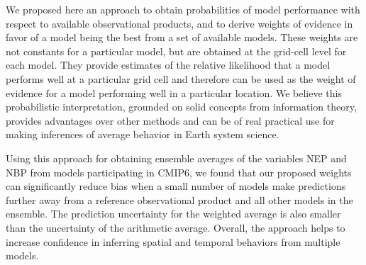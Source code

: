 \documentclass[gmd, manuscript]{copernicus}
\begin{document}
\conclusions  %
We proposed here an approach to obtain probabilities of model performance with respect to available observational products, and to derive weights of evidence in favor of a model being the best from a set of available models. These weights are not constants for a particular model, but are obtained at the grid-cell level for each model. They provide estimates of the relative likelihood that a model performs well at a particular grid cell and therefore can be used as the weight of evidence for a model performing well in a particular location. We believe this probabilistic interpretation, grounded on solid concepts from information theory, provides advantages over other methods and can be of real practical use for making inferences of average behavior in Earth system science. 

Using this approach for obtaining ensemble averages of the variables NEP and NBP from models participating in CMIP6, we found that our proposed weights can significantly reduce bias when a small number of models make predictions further away from a reference observational product and all other models in the ensemble. The prediction uncertainty for the weighted average is also smaller than the uncertainty of the arithmetic average. Overall, the approach helps to increase confidence in inferring spatial and temporal behaviors from multiple models.









\end{document}
